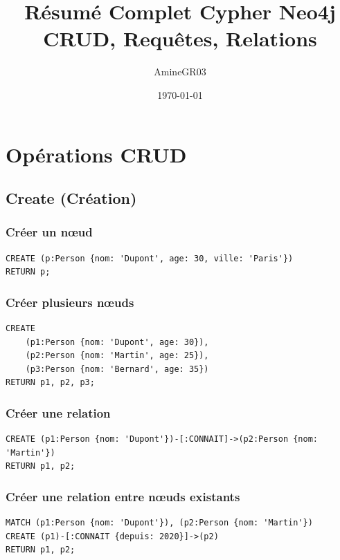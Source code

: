\documentclass[11pt,a4paper]{article}
\title{Résumé Complet Cypher Neo4j\\
\large CRUD, Requêtes, Relations}
\author{AmineGR03}
\date{\today}
\begin{document}
\maketitle

\tableofcontents
\newpage

\section{Opérations CRUD}

\subsection{Create (Création)}

\subsubsection{Créer un nœud}

\begin{lstlisting}
CREATE (p:Person {nom: 'Dupont', age: 30, ville: 'Paris'})
RETURN p;
\end{lstlisting}

\subsubsection{Créer plusieurs nœuds}

\begin{lstlisting}
CREATE 
    (p1:Person {nom: 'Dupont', age: 30}),
    (p2:Person {nom: 'Martin', age: 25}),
    (p3:Person {nom: 'Bernard', age: 35})
RETURN p1, p2, p3;
\end{lstlisting}

\subsubsection{Créer une relation}

\begin{lstlisting}
CREATE (p1:Person {nom: 'Dupont'})-[:CONNAIT]->(p2:Person {nom: 'Martin'})
RETURN p1, p2;
\end{lstlisting}

\subsubsection{Créer une relation entre nœuds existants}

\begin{lstlisting}
MATCH (p1:Person {nom: 'Dupont'}), (p2:Person {nom: 'Martin'})
CREATE (p1)-[:CONNAIT {depuis: 2020}]->(p2)
RETURN p1, p2;
\end{lstlisting}
\end{document}
